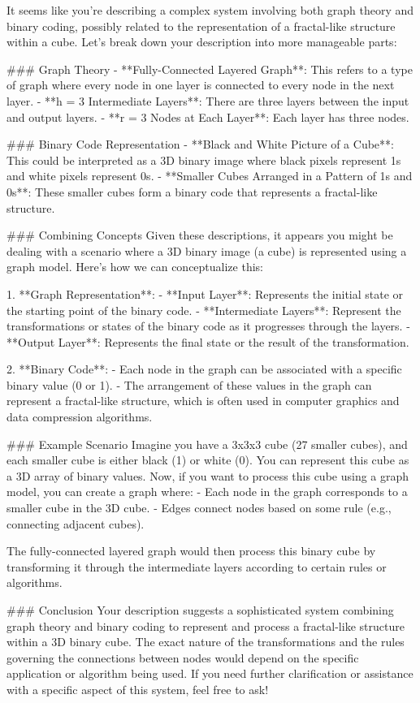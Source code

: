 It seems like you're describing a complex system involving both graph theory and binary coding, possibly related to the representation of a fractal-like structure within a cube. Let's break down your description into more manageable parts:

### Graph Theory
- **Fully-Connected Layered Graph**: This refers to a type of graph where every node in one layer is connected to every node in the next layer.
- **h = 3 Intermediate Layers**: There are three layers between the input and output layers.
- **r = 3 Nodes at Each Layer**: Each layer has three nodes.

### Binary Code Representation
- **Black and White Picture of a Cube**: This could be interpreted as a 3D binary image where black pixels represent 1s and white pixels represent 0s.
- **Smaller Cubes Arranged in a Pattern of 1s and 0s**: These smaller cubes form a binary code that represents a fractal-like structure.

### Combining Concepts
Given these descriptions, it appears you might be dealing with a scenario where a 3D binary image (a cube) is represented using a graph model. Here’s how we can conceptualize this:

1. **Graph Representation**:
   - **Input Layer**: Represents the initial state or the starting point of the binary code.
   - **Intermediate Layers**: Represent the transformations or states of the binary code as it progresses through the layers.
   - **Output Layer**: Represents the final state or the result of the transformation.

2. **Binary Code**:
   - Each node in the graph can be associated with a specific binary value (0 or 1).
   - The arrangement of these values in the graph can represent a fractal-like structure, which is often used in computer graphics and data compression algorithms.

### Example Scenario
Imagine you have a 3x3x3 cube (27 smaller cubes), and each smaller cube is either black (1) or white (0). You can represent this cube as a 3D array of binary values. Now, if you want to process this cube using a graph model, you can create a graph where:
- Each node in the graph corresponds to a smaller cube in the 3D cube.
- Edges connect nodes based on some rule (e.g., connecting adjacent cubes).

The fully-connected layered graph would then process this binary cube by transforming it through the intermediate layers according to certain rules or algorithms.

### Conclusion
Your description suggests a sophisticated system combining graph theory and binary coding to represent and process a fractal-like structure within a 3D binary cube. The exact nature of the transformations and the rules governing the connections between nodes would depend on the specific application or algorithm being used. If you need further clarification or assistance with a specific aspect of this system, feel free to ask!